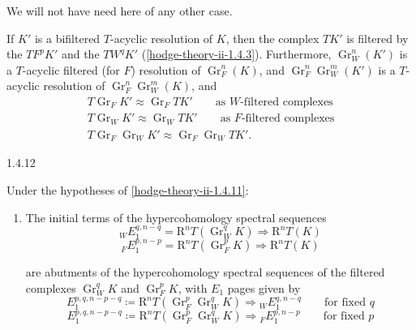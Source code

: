     We will not have need here of any other case.\par{}If \(K'\) is a bifiltered \(T\)-acyclic resolution of \(K\), then the complex \(TK'\) is filtered by the \(TF^pK'\) and the \(TW^qK'\) (\cref{hodge-theory-ii-1.4.3}).
    Furthermore, \(\operatorname {Gr}_W^n(K')\) is a \(T\)-acyclic filtered (for \(F\)) resolution of \(\operatorname {Gr}_F^n(K)\), and \(\operatorname {Gr}_F^n\operatorname {Gr}_W^m(K')\) is a \(T\)-acyclic resolution of \(\operatorname {Gr}_F^n\operatorname {Gr}_W^m(K)\), and
    \[       \begin {gathered}         T\operatorname {Gr}_F K'         \approx  \operatorname {Gr}_F TK'         \qquad \text {as }W\text {-filtered complexes}       \\T\operatorname {Gr}_W K'         \approx  \operatorname {Gr}_W TK'         \qquad \text {as }F\text {-filtered complexes}       \\T\operatorname {Gr}_F\operatorname {Gr}_W K'         \approx  \operatorname {Gr}_F\operatorname {Gr}_W TK'.       \end {gathered}     \]\begin{lemma}{1.4.12}\label{hodge-theory-ii-1.4.12}\skipsinglepar\par{}Under the hypotheses of \cref{hodge-theory-ii-1.4.11}:

    
 \begin{enumerate}
      
 \item[(i)]
        The initial terms of the hypercohomology spectral sequences
        \[           {}_WE_1^{q,n-q}           = \mathrm {R}^nT(\operatorname {Gr}_W^qK)           \Rightarrow  \mathrm {R}^nT(K)         \tag{1}         \]
        \[           {}_FE_1^{p,n-p}           = \mathrm {R}^nT(\operatorname {Gr}_F^pK)           \Rightarrow  \mathrm {R}^nT(K)         \tag{2}         \]
        
        are abutments of the hypercohomology spectral sequences of the filtered complexes \(\operatorname {Gr}_W^qK\) and \(\operatorname {Gr}_F^pK\), with \(E_1\) pages given by
        \[           E_1^{p,q,n-p-q}           \coloneqq  \mathrm {R}^nT(\operatorname {Gr}_F^p\operatorname {Gr}_W^qK)           \Rightarrow  {}_WE_1^{q,n-q}           \qquad \text {for fixed }q         \tag{3}         \]
        \[           E_1^{p,q,n-p-q}           \coloneqq  \mathrm {R}^nT(\operatorname {Gr}_F^p\operatorname {Gr}_W^qK)           \Rightarrow  {}_FE_1^{p,n-p}           \qquad \text {for fixed }p         \tag{4}         \]
      



\end{enumerate}
\end{lemma}
